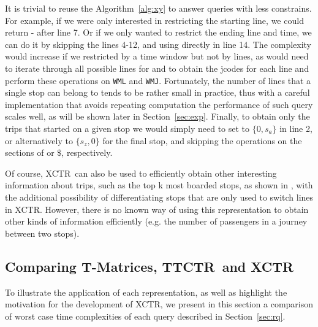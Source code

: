 \documentclass[runningheads]{llncs}
\newcommand{\acumm}{T-Matrices} %
\newcommand{\ctr}{XCTR}
\newcommand{\ttctr}{TTCTR}
\begin{document}
It is trivial to reuse the Algorithm~\ref{alg:xy} to answer queries with less constrains. For example, if we were only interested in restricting the starting line, we could return - after line 7. Or if we only wanted to restrict the ending line and time, we can do it by skipping the lines 4-12, and using directly  in line 14. The complexity would increase if we restricted by a time window but not by lines, as would need to iterate through all possible lines for  and  to obtain the jcodes for each line and perform these operations on \texttt{WML} and \texttt{WMJ}. Fortunately, the number of lines that a single stop can belong to tends to be rather small in practice, thus with a careful implementation that avoids repeating computation the performance of such query scales well, as will be shown later in Section~\ref{sec:exp}. Finally, to obtain only the trips that started on a given stop we would simply need to set  to $\{0,s_a\}$ in line 2, or alternatively to $\{s_z,0\}$ for the final stop, and skipping the operations on the sections of  or $\$$, respectively.

Of course, \ctr~can also be used to efficiently obtain other interesting information about trips, such as the top k most boarded stops, as shown in \cite{brisaboa2018compact}, with the additional possibility of differentiating stops that are only used to switch lines in \ctr. However, there is no known way of using this representation to obtain other kinds of information efficiently (e.g. the number of passengers in a journey between two stops).

\subsection{Comparing \acumm, \ttctr~and \ctr}
\label{sec:comp}
To illustrate the application of each representation, as well as highlight the motivation for the development of \ctr, we present in this section a comparison of worst case time complexities of each query described in Section~\ref{sec:rq}.
\end{document}
